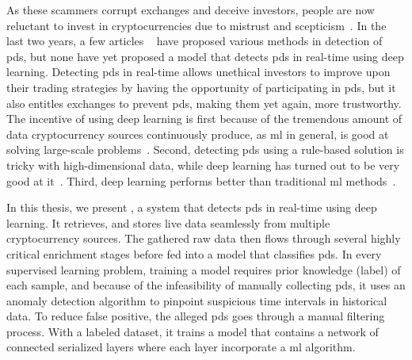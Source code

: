 As these scammers corrupt exchanges and deceive investors, people are now reluctant to invest in cryptocurrencies due to mistrust and scepticism~\cite{anchor}. In the last two years, a few articles ~\cite{P&D_to_the_moon, P&D_anatomy, P&D_scheme, P&D_pumping} have proposed various methods in detection of \acp{pd}, but none have yet proposed a model that detects \acp{pd} in real-time using deep learning. Detecting \acp{pd} in real-time allows unethical investors to improve upon their trading strategies by having the opportunity of participating in \acp{pd}, but it also entitles exchanges to prevent \acp{pd}, making them yet again, more trustworthy. The incentive of using deep learning is first because of the tremendous amount of data cryptocurrency sources continuously produce, as \ac{ml} in general, is good at solving large-scale problems~\cite{aws}. Second, detecting \acp{pd} using a rule-based solution is tricky with high-dimensional data, while deep learning has turned out to be very good at it~\cite{lecun2015deep}. Third, deep learning performs better than traditional \ac{ml} methods~\cite{dl_intrusion, peng2015multi}. 

In this thesis, we present \project, a system that detects \acp{pd} in real-time using deep learning. It retrieves, and stores live data seamlessly from multiple cryptocurrency sources. The gathered raw data then flows through several highly critical enrichment stages before fed into a model that classifies \acp{pd}. In every supervised learning problem, training a model requires prior knowledge (label) of each sample, and because of the infeasibility of manually collecting \acp{pd}, it uses an anomaly detection algorithm to pinpoint suspicious time intervals in historical data. To reduce false positive, the alleged \acp{pd} goes through a manual filtering process. With a labeled dataset, it trains a model that contains a network of connected serialized layers where each layer incorporate a \ac{ml} algorithm.



